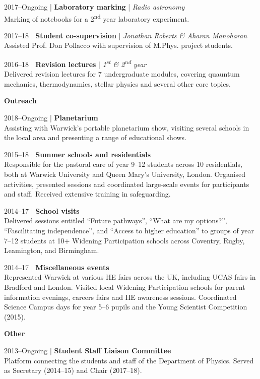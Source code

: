 \documentclass[10pt,a4paper]{altacv}
\begin{document}
\medskip

\small 2017--Ongoing | \textbf{Laboratory marking} | \textit{Radio astronomy} \\
Marking of notebooks for a 2\textsuperscript{nd} year laboratory experiment.

\divider

\small 2017--18 | \textbf{Student co-supervision} | \textit{Jonathan Roberts \& Aharan Manoharan} \\
Assisted Prof. Don Pollacco with supervision of M.Phys. project students.

\divider

\small 2016--18 | \textbf{Revision lectures} | \textit{1\textsuperscript{st} \& 2\textsuperscript{nd} year} \\
Delivered revision lectures for 7 undergraduate modules, covering quauntum mechanics, thermodynamics, stellar physics and several other core topics.

\medskip

\normalsize \textbf{Outreach}

\medskip

\small 2018--Ongoing | \textbf{Planetarium} \\
Assisting with Warwick's portable planetarium show, visiting several schools in the local area and presenting a range of educational shows.

\divider

\small 2015--18 | \textbf{Summer schools and residentials} \\
Responsible for the pastoral care of year 9--12 students across 10 residentials, both at Warwick University and Queen Mary's University, London.
Organised activities, presented sessions and coordinated large-scale events for participants and staff.
Received extensive training in safeguarding.

\divider

\small 2014--17 | \textbf{School visits} \\
Delivered sessions entitled ``Future pathways'', ``What are my options?'', ``Fascilitating independence'', and ``Access to higher education'' to groups of year 7--12 students at 10+ Widening Participation schools across Coventry, Rugby, Leamington, and Birmingham.

\divider

\small 2014--17 | \textbf{Miscellaneous events} \\
Represented Warwick at various HE fairs across the UK, including UCAS fairs in Bradford and London.
Visited local Widening Participation schools for parent information evenings, careers fairs and HE awareness sessions.
Coordinated Science Campus days for year 5--6 pupils and the Young Scientist Competition (2015).

\medskip

\normalsize \textbf{Other}

\medskip

\small 2013--Ongoing | \textbf{Student Staff Liaison Committee} \\
Platform connecting the students and staff of the Department of Physics.
Served as Secretary (2014--15) and Chair (2017--18).
\end{document}
